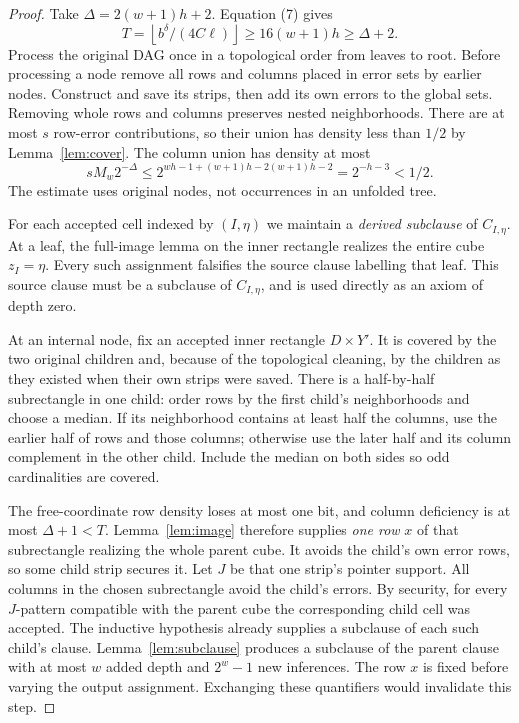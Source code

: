 \documentclass[11pt]{article}
\newcommand{\floor}[1]{\left\lfloor #1\right\rfloor}
\begin{document}
\begin{proof}
Take $\Delta=2(w+1)h+2$. Equation (7) gives
\[
 T=\floor{b^\delta/(4C\ell)}\ge16(w+1)h\ge\Delta+2.
\]
Process the original DAG once in a topological order from leaves to root.
Before processing a node remove all rows and columns placed in error sets
by earlier nodes. Construct and save its strips, then add its own errors
to the global sets. Removing whole rows and columns preserves nested
neighborhoods. There are at most $s$ row-error contributions, so their
union has density less than $1/2$ by Lemma~\ref{lem:cover}. The column union
has density at most
\[
 sM_w2^{-\Delta}
 \le 2^{wh-1+(w+1)h-2(w+1)h-2}=2^{-h-3}<1/2.            \tag{9}
\]
The estimate uses original nodes, not occurrences in an unfolded tree.

For each accepted cell indexed by $(I,\eta)$ we maintain a \emph{derived
subclause} of $C_{I,\eta}$. At a leaf, the full-image lemma on the inner
rectangle realizes the entire cube $z_I=\eta$. Every such assignment
falsifies the source clause labelling that leaf. This source clause must be
a subclause of $C_{I,\eta}$, and is used directly as an axiom of depth zero.

At an internal node, fix an accepted inner rectangle $D\times Y'$. It is
covered by the two original children and, because of the topological
cleaning, by the children as they existed when their own strips were saved.
There is a half-by-half subrectangle in one child: order rows by the first
child's neighborhoods and choose a median. If its neighborhood contains at
least half the columns, use the earlier half of rows and those columns;
otherwise use the later half and its column complement in the other child.
Include the median on both sides so odd cardinalities are covered.

The free-coordinate row density loses at most one bit, and column
deficiency is at most $\Delta+1<T$. Lemma~\ref{lem:image} therefore supplies
\emph{one row} $x$ of that subrectangle realizing the whole parent cube.
It avoids the child's own error rows, so some child strip secures it. Let
$J$ be that one strip's pointer support. All columns in the chosen
subrectangle avoid the child's errors. By security, for every $J$-pattern
compatible with the parent cube the corresponding child cell was accepted.
The inductive hypothesis already supplies a subclause of each such child's
clause. Lemma~\ref{lem:subclause} produces a subclause of the parent clause
with at most $w$ added depth and $2^w-1$ new inferences. The row $x$ is fixed
before varying the output assignment. Exchanging these quantifiers would
invalidate this step.


\end{proof}
\end{document}
